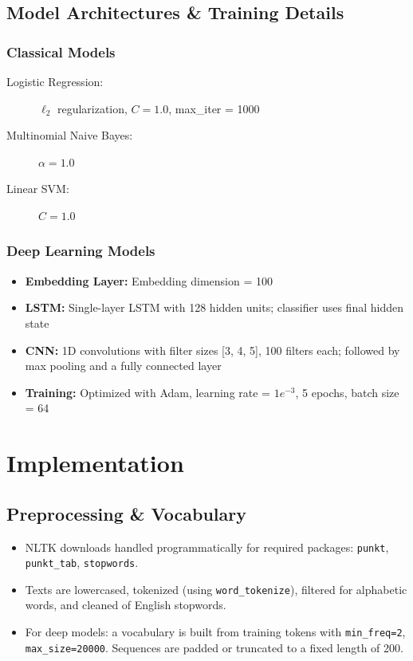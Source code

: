 \documentclass[12pt,a4paper]{article}
\begin{document}
\subsection{Model Architectures \& Training Details}
\subsubsection{Classical Models}
\begin{description}
  \item[Logistic Regression:] $\ell_2$ regularization, $C = 1.0$, max\_iter = 1000
  \item[Multinomial Naive Bayes:] $\alpha = 1.0$
  \item[Linear SVM:] $C = 1.0$
\end{description}

\subsubsection{Deep Learning Models}
\begin{itemize}
  \item \textbf{Embedding Layer:} Embedding dimension = 100
  \item \textbf{LSTM:} Single-layer LSTM with 128 hidden units; classifier uses final hidden state
  \item \textbf{CNN:} 1D convolutions with filter sizes [3, 4, 5], 100 filters each; followed by max pooling and a fully connected layer
  \item \textbf{Training:} Optimized with Adam, learning rate = $1e^{-3}$, 5 epochs, batch size = 64
\end{itemize}

\section{Implementation}
\subsection{Preprocessing \& Vocabulary}
\begin{itemize}
  \item NLTK downloads handled programmatically for required packages: \texttt{punkt}, \texttt{punkt\_tab}, \texttt{stopwords}.
  \item Texts are lowercased, tokenized (using \texttt{word\_tokenize}), filtered for alphabetic words, and cleaned of English stopwords.
  \item For deep models: a vocabulary is built from training tokens with \texttt{min\_freq=2}, \texttt{max\_size=20000}. Sequences are padded or truncated to a fixed length of 200.
\end{itemize}
\end{document}
